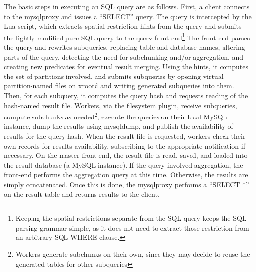 \documentclass{article}
\begin{document}
The basic steps in executing an SQL query are as follows.  First, a
client connects to the mysqlproxy and issues a ``SELECT'' query.  The
query is intercepted by the Lua script, which extracts spatial
restriction hints from the query and submits the lightly-modified
pure SQL query to the qserv front-end\footnote{Keeping the spatial
  restrictions separate from the SQL query keeps the SQL parsing
  grammar simple, as it does not need to extract those restriction
  from an arbitrary SQL WHERE clause.}  The front-end parses the query and
rewrites subqueries, replacing table and database names, altering
parts of the query, detecting the need for subchunking and/or
aggregation, and creating new predicates for eventual result merging.
Using the hints, it computes the set of partitions involved, and
submits subqueries by opening virtual partition-named files on xrootd
and writing generated subqueries into them.  Then, for each subquery,
it computes the query hash and requests reading of the hash-named
result file. Workers, via the filesystem plugin, receive subqueries,
compute subchunks as needed\footnote{Workers generate subchunks on
  their own, since they may decide to reuse the generated tables for
  other subqueries}, execute the queries on their local MySQL
instance, dump the results using mysqldump, and publish the
availability of results for the query hash.  When the result file is
requested, workers check their own records for results availability,
subscribing to the appropriate notification if necessary.  On the
master front-end, the result file is read, saved, and loaded into the
result database (a MySQL instance).  If the query involved
aggregation, the front-end performs the aggregation query at this time.
Otherwise, the results are simply concatenated.  Once this is done,
the mysqlproxy performs a ``SELECT *'' on the result table and returns
results to the client.
\end{document}
